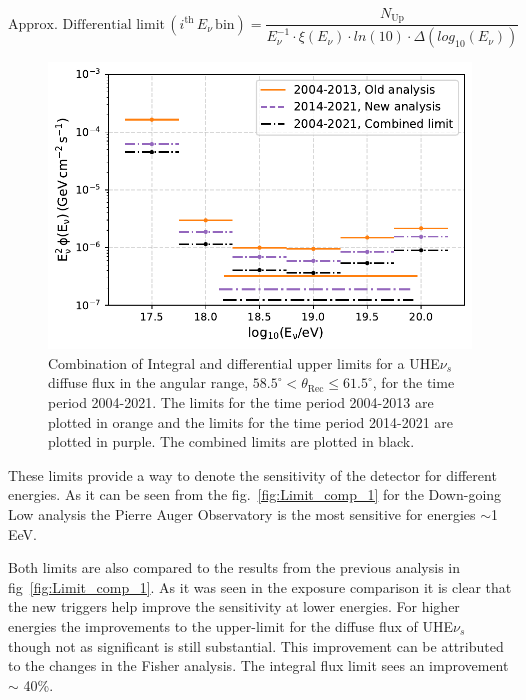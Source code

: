 \begin{equation}
  \label{eq:diff_lim_approx}
 \text{Approx. Differential limit} \, (i^{\text{th}} \, E_{\nu} \, \text{bin})  = \frac{N_{\text{Up}}}{E^{-1}_{\nu} \cdot \xi(E_{\nu}) \cdot ln(10) \cdot \Delta (log_{10}(E_{\nu}))}
\end{equation}
\begin{figure}[t!]
  \centering
  \includegraphics[width=14.5cm]{thesis_figures/ExpLimits/Integ_DiffLimit_comp_combined_new_sim_optim.pdf}
  \caption{Combination of Integral and differential upper limits for a UHE$\nu_s$ diffuse flux in the angular range, $ 58.5^{\circ} <\theta_{\text{Rec}} \leq 61.5^{\circ}$, for the time period 2004-2021. The limits for the time period 2004-2013 are plotted in orange and the limits for the time period 2014-2021 are plotted in purple. The combined limits are plotted in black.}
  \label{fig:Limit_comp_2}
\end{figure}

These limits provide a way to denote the sensitivity of the detector for different energies. As it can be seen from the fig.~\ref{fig:Limit_comp_1} for the Down-going Low analysis the Pierre Auger Observatory is the most sensitive for energies $\sim$1 EeV. 

Both limits are also compared to the results from the previous analysis in fig~\ref{fig:Limit_comp_1}. As it was seen in the exposure comparison it is clear that the new triggers help improve the sensitivity at lower energies. For higher energies the improvements to the upper-limit for the diffuse flux of UHE${\nu_s}$ though not as significant is still substantial. This improvement can be attributed to the changes in the Fisher analysis. The integral flux limit sees an improvement $\sim$ 40\%. 

